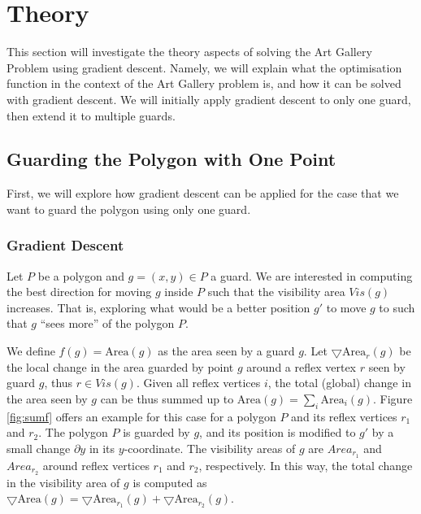 \section{Theory}
\label{sec:theory}

This section will investigate the theory aspects of solving the Art Gallery Problem using gradient descent. Namely, we will explain what the optimisation function in the context of the Art Gallery problem is, and how it can be solved with gradient descent. We will initially apply gradient descent to only one guard, then extend it to multiple guards.

\subsection{Guarding the Polygon with One Point}

First, we will explore how gradient descent can be applied for the case that we want to guard the polygon using only one guard.

\subsubsection{Gradient Descent}
\label{sec:gradient}

Let $P$ be a polygon and $g = (x, y) \in P$ a guard. We are interested in computing the best direction for moving $g$ inside $P$ such that the visibility area $\mathit{Vis}(g)$ increases. That is, exploring what would be a better position $g'$ to move $g$ to such that $g$ ``sees more'' of the polygon $P$. 

We define $f(g) = \text{Area}(g)$ as the area seen by a guard $g$. Let $\bigtriangledown \text{Area}_r(g)$ be the local change in the area guarded by point $g$ around a reflex vertex $r$ seen by guard $g$, thus $r \in \mathit{Vis(g)}$. Given all reflex vertices $i$, the total (global) change in the area seen by $g$ can be thus summed up to $\text{Area}(g) = \sum_i \text{Area}_i(g)$. Figure \ref{fig:sumf} offers an example for this case for a polygon $P$ and its reflex vertices $r_1$ and $r_2$. The polygon $P$ is guarded by $g$, and its position is modified to $g'$ by a small change $\partial y$ in its $y$-coordinate. The visibility areas of $g$ are $Area_{r_1}$ and $Area_{r_2}$ around reflex vertices $r_1$ and $r_2$, respectively. In this way, the total change in the visibility area of $g$ is computed as $\bigtriangledown \text{Area}(g) = \bigtriangledown \text{Area}_{r_1}(g) + \bigtriangledown \text{Area}_{r_2}(g)$.

